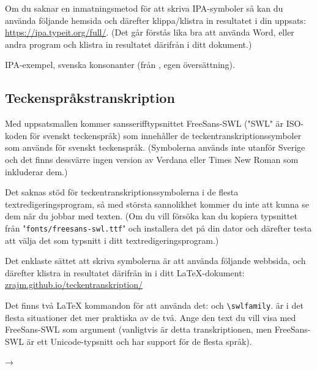 Om du saknar en inmatningsmetod för att skriva IPA-symboler så kan du använda
följande hemsida och därefter klippa/klistra in resultatet i din uppsats:
\url{https://ipa.typeit.org/full/}. (Det går förstås lika bra att använda Word,
eller andra program och klistra in resultatet därifrån i ditt dokument.)

\begin{table}
  \caption{IPA-exempel, svenska konsonanter (från \citealp[140]{engstrand-1999},
    egen översättning).}
  \label{tab-ipa}
  \vspace{.5em}
  
  \vspace{1em}
\end{table}


\subsection{Teckenspråkstranskription}
\label{teckenspråk}

Med uppsatsmallen kommer sansserifftypsnittet FreeSans-SWL ("SWL" är ISO-koden
för svenskt teckenspråk) som innehåller de teckentranskriptionssymboler som
används för svenskt teckenspråk. (Symbolerna används inte utanför Sverige och
det finns dessvärre ingen version av Verdana eller Times New Roman som
inkluderar dem.)

Det saknas stöd för teckentranskriptionssymbolerna i de flesta
textredigeringsprogram, så med största sannolikhet kommer du inte att kunna se
dem när du jobbar med texten. (Om du vill försöka kan du kopiera typsnittet
från "\texttt{fonts/freesans-swl.ttf}" och installera det på din dator och
därefter testa att välja det som typsnitt i ditt textredigeringsprogram.)

Det enklaste sättet att skriva symbolerna är att använda följande webbsida, och
därefter klistra in resultatet därifrån in i ditt \LaTeX{}-dokument:
\href{https://zrajm.github.io/teckentranskription/}{\url{zrajm.github.io/teckentranskription/}}

Det finns två \LaTeX{} kommandon för att använda det:  och
\verb|\swlfamily|.  är i det flesta situationer det mer
praktiska av de två. Ange den text du vill visa med FreeSans-SWL som argument
(vanligtvis är detta transkriptionen, men FreeSans-SWL är ett Unicode-typsnitt
och har support för de flesta språk).

\medskip

\hspace{1em} → 

